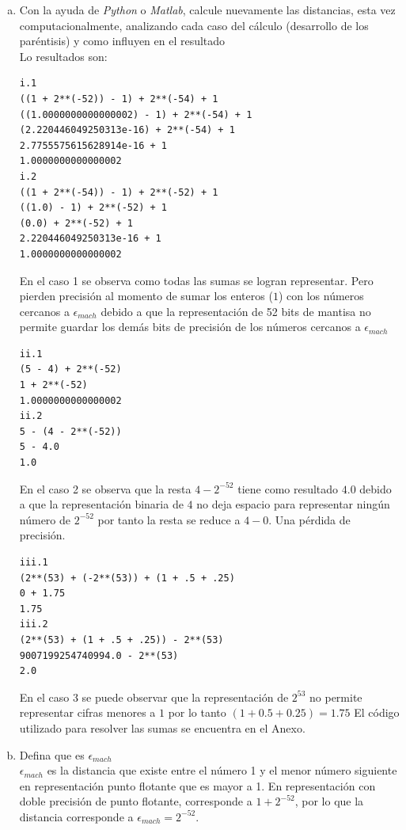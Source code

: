 \documentclass[10pt]{article}
\begin{document}
\begin{enumerate}[a)]
\begin{enumerate}[(i)]
\end{enumerate}

\item Con la ayuda de \textit{Python} o \textit{Matlab}, calcule nuevamente las distancias, esta vez computacionalmente, analizando cada caso del cálculo (desarrollo de los paréntisis) y como influyen en el resultado\\
Lo resultados son:
\begin{verbatim}
i.1
((1 + 2**(-52)) - 1) + 2**(-54) + 1
((1.0000000000000002) - 1) + 2**(-54) + 1
(2.220446049250313e-16) + 2**(-54) + 1
2.7755575615628914e-16 + 1
1.0000000000000002
i.2
((1 + 2**(-54)) - 1) + 2**(-52) + 1
((1.0) - 1) + 2**(-52) + 1
(0.0) + 2**(-52) + 1
2.220446049250313e-16 + 1
1.0000000000000002
\end{verbatim}
En el caso 1 se observa como todas las sumas se logran representar. Pero pierden precisión al momento de sumar los enteros ($1$) con los números cercanos a $\epsilon_{mach}$ debido a que la representación de 52 bits de mantisa no permite guardar los demás bits de precisión de los números cercanos a $\epsilon_{mach}$
\begin{verbatim}
ii.1
(5 - 4) + 2**(-52)
1 + 2**(-52)
1.0000000000000002
ii.2
5 - (4 - 2**(-52))
5 - 4.0
1.0
\end{verbatim}
En el caso 2 se observa que la resta $4 - 2^{-52}$ tiene como resultado $4.0$ debido a que la representación binaria de $4$ no deja espacio para representar ningún número de $2^{-52}$ por tanto la resta se reduce a $4 - 0$. Una pérdida de precisión.
\begin{verbatim}
iii.1
(2**(53) + (-2**(53)) + (1 + .5 + .25)
0 + 1.75
1.75
iii.2
(2**(53) + (1 + .5 + .25)) - 2**(53)
9007199254740994.0 - 2**(53)
2.0
\end{verbatim}
En el caso 3 se puede observar que la representación de $2^{53}$ no permite representar cifras menores a $1$ por lo tanto $(1 + 0.5 + 0.25) = 1.75$ 
El código utilizado para resolver las sumas se encuentra en el Anexo.

\item Defina que es $\epsilon_{mach}$\\
$\epsilon_{mach}$ es la distancia que existe entre el número 1 y el menor número siguiente en representación punto flotante que es mayor a 1.
En representación con doble precisión de punto flotante, corresponde a $1 + 2^{-52}$, por lo que la distancia corresponde  a $\epsilon_{mach} = 2^{-52}$.


\end{enumerate}
\end{document}

